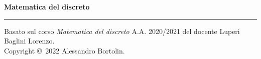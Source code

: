 \documentclass[8pt,landscape]{article}
\begin{document}
\raggedright
\footnotesize
\begin{multicols}{3}

\setlength{\premulticols}{1pt}
\setlength{\postmulticols}{1pt}
\setlength{\multicolsep}{1pt}
\setlength{\columnsep}{2pt}

{\Large{\textbf{Matematica del discreto}}}


































\rule{29em}{0.4pt}

\begin{wrapfigure}[3]{r}{8em}
	\vspace{-1.3em}
	\centering
	\doclicenseImage[imagewidth=7em]
\end{wrapfigure}

Basato sul corso \emph{Matematica del discreto} A.A. 2020/2021 del docente Luperi Baglini Lorenzo. \\

Copyright \copyright \, 2022 Alessandro Bortolin.

\doclicenseText
\end{multicols}
\end{document}
